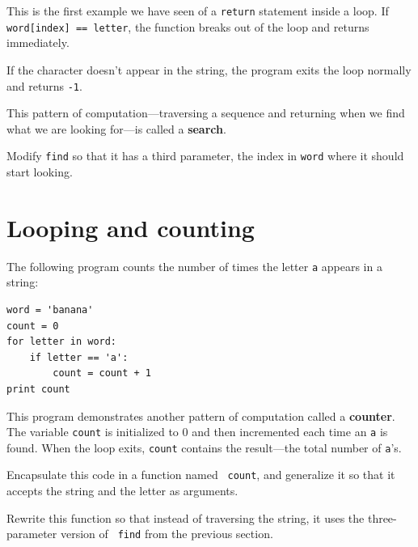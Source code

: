 \documentclass[10pt]{book}
\begin{document}
This is the first example we have seen of a {\tt return} statement
inside a loop.  If {\tt word[index] == letter}, the function breaks
out of the loop and returns immediately.

If the character doesn't appear in the string, the program
exits the loop normally and  returns {\tt -1}.

This pattern of computation---traversing a sequence and returning
when we find what we are looking for---is called a {\bf search}.

\begin{exercise}

Modify {\tt find} so that it has a
third parameter, the index in {\tt word} where it should start
looking.

\end{exercise}


\section{Looping and counting}
\label{counter}

The following program counts the number of times the letter {\tt a}
appears in a string:

\begin{verbatim}
word = 'banana'
count = 0
for letter in word:
    if letter == 'a':
        count = count + 1
print count
\end{verbatim}
%
This program demonstrates another pattern of computation called a {\bf
counter}.  The variable {\tt count} is initialized to 0 and then
incremented each time an {\tt a} is found.
When the loop exits, {\tt count}
contains the result---the total number of {\tt a}'s.

\begin{exercise}

Encapsulate this code in a function named {\tt
count}, and generalize it so that it accepts the string and the
letter as arguments.
\end{exercise}

\begin{exercise}

Rewrite this function so that instead of
traversing the string, it uses the three-parameter version of {\tt
find} from the previous section.

\end{exercise}
\end{document}
